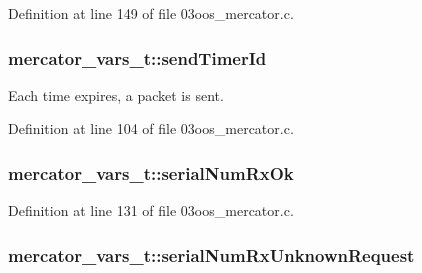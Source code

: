 Definition at line 149 of file 03oos\+\_\+mercator.\+c.

\subsubsection[{\texorpdfstring{send\+Timer\+Id}{sendTimerId}}]{ mercator\+\_\+vars\+\_\+t\+::send\+Timer\+Id}\hypertarget{structmercator__vars__t_a37c913d40dc49d448cf02e35f72a5a83}{}\label{structmercator__vars__t_a37c913d40dc49d448cf02e35f72a5a83}


Each time expires, a packet is sent. 



Definition at line 104 of file 03oos\+\_\+mercator.\+c.

\subsubsection[{\texorpdfstring{serial\+Num\+Rx\+Ok}{serialNumRxOk}}]{ mercator\+\_\+vars\+\_\+t\+::serial\+Num\+Rx\+Ok}\hypertarget{structmercator__vars__t_a863c710cc98e18cc1e0a2f3aad3e5bbc}{}\label{structmercator__vars__t_a863c710cc98e18cc1e0a2f3aad3e5bbc}


Definition at line 131 of file 03oos\+\_\+mercator.\+c.

\subsubsection[{\texorpdfstring{serial\+Num\+Rx\+Unknown\+Request}{serialNumRxUnknownRequest}}]{ mercator\+\_\+vars\+\_\+t\+::serial\+Num\+Rx\+Unknown\+Request}\hypertarget{structmercator__vars__t_a29216af420f8e078dcd52a64559c2a85}{}\label{structmercator__vars__t_a29216af420f8e078dcd52a64559c2a85}


